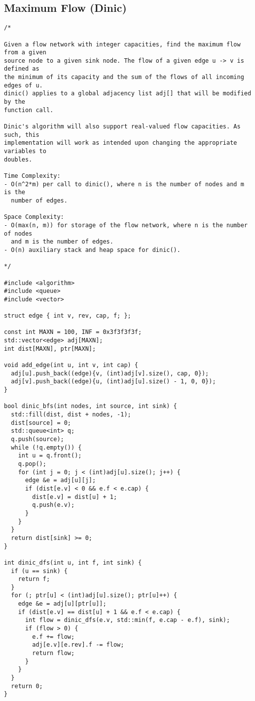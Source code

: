 \subsection{Maximum Flow (Dinic)}
\begin{lstlisting}
/*

Given a flow network with integer capacities, find the maximum flow from a given
source node to a given sink node. The flow of a given edge u -> v is defined as
the minimum of its capacity and the sum of the flows of all incoming edges of u.
dinic() applies to a global adjacency list adj[] that will be modified by the
function call.

Dinic's algorithm will also support real-valued flow capacities. As such, this
implementation will work as intended upon changing the appropriate variables to
doubles.

Time Complexity:
- O(n^2*m) per call to dinic(), where n is the number of nodes and m is the
  number of edges.

Space Complexity:
- O(max(n, m)) for storage of the flow network, where n is the number of nodes
  and m is the number of edges.
- O(n) auxiliary stack and heap space for dinic().

*/

#include <algorithm>
#include <queue>
#include <vector>

struct edge { int v, rev, cap, f; };

const int MAXN = 100, INF = 0x3f3f3f3f;
std::vector<edge> adj[MAXN];
int dist[MAXN], ptr[MAXN];

void add_edge(int u, int v, int cap) {
  adj[u].push_back((edge){v, (int)adj[v].size(), cap, 0});
  adj[v].push_back((edge){u, (int)adj[u].size() - 1, 0, 0});
}

bool dinic_bfs(int nodes, int source, int sink) {
  std::fill(dist, dist + nodes, -1);
  dist[source] = 0;
  std::queue<int> q;
  q.push(source);
  while (!q.empty()) {
    int u = q.front();
    q.pop();
    for (int j = 0; j < (int)adj[u].size(); j++) {
      edge &e = adj[u][j];
      if (dist[e.v] < 0 && e.f < e.cap) {
        dist[e.v] = dist[u] + 1;
        q.push(e.v);
      }
    }
  }
  return dist[sink] >= 0;
}

int dinic_dfs(int u, int f, int sink) {
  if (u == sink) {
    return f;
  }
  for (; ptr[u] < (int)adj[u].size(); ptr[u]++) {
    edge &e = adj[u][ptr[u]];
    if (dist[e.v] == dist[u] + 1 && e.f < e.cap) {
      int flow = dinic_dfs(e.v, std::min(f, e.cap - e.f), sink);
      if (flow > 0) {
        e.f += flow;
        adj[e.v][e.rev].f -= flow;
        return flow;
      }
    }
  }
  return 0;
}


\end{lstlisting}
